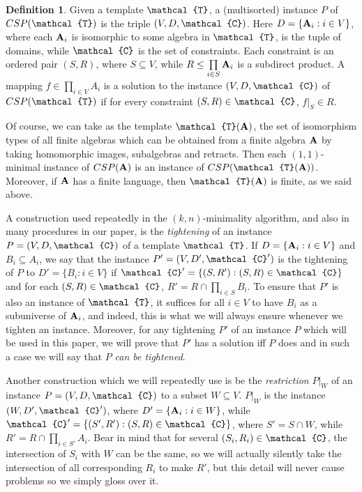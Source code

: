 \documentclass[11pt]{amsart}
\newcommand{\m}[1]{{\uppercase {\mathbf {#1}}}}
\newcommand{\vr}[1]{{\uppercase {\mathcal{#1}}}}
\theoremstyle{definition}
\newtheorem{df}[thm]{Definition}
\begin{document}
\begin{df}\label{multisortedCSP}
Given a template $\vr t$, a (multisorted) instance $P$ of $CSP(\vr t)$ is the triple $(V, D, \vr c)$. Here $D=\{\m a_i:i\in V\}$, where each $\m a_i$ is isomorphic to some algebra in $\vr t$, is the tuple of domains, while $\vr c$ is the set of constraints. Each constraint is an ordered pair $(S,R)$, where $S\subseteq V$, while $R\leq \prod\limits_{i\in S}\m a_i$ is a subdirect product. A mapping $f\in\prod\limits_{i\in V}A_i$ is a solution to the instance $(V,D,\vr c)$ of $CSP(\vr t)$ if for every constraint $(S,R)\in \vr c$, $f|_S\in R$.
\end{df}

Of course, we can take as the template $\vr t(\m a)$, the set of isomorphism types of all finite algebras which can be obtained from a finite algebra $\m a$ by taking homomorphic images, subalgebras and retracts. Then each $(1,1)$-minimal instance of $CSP(\m a)$ is an instance of $CSP(\vr t(\m a))$. Moreover, if $\m a$ has a finite language, then $\vr t(\m a)$ is finite, as we said above.

A construction used repeatedly in the $(k,n)$-minimality algorithm, and also in many procedures in our paper, is the {\em tightening} of an instance $P=(V,D,\vr c)$ of a template $\vr t$. If $D=\{\m A_i:i\in V\}$ and $B_i\subseteq A_i$, we say that the instance $P'=(V,D',\vr c')$ is the tightening of $P$ to $D'=\{B_i:i\in V\}$ if $\vr c'=\{(S,R'):(S,R)\in \vr c\}$ and for each $(S,R)\in \vr c$, $R'=R\cap\prod\limits_{i\in S}B_i$. To ensure that $P'$ is also an instance of $\vr t$, it suffices for all $i\in V$ to have $B_i$ as a subuniverse of $\m a_i$, and indeed, this is what we will always ensure whenever we tighten an instance. Moreover, for any tightening $P'$ of an instance $P$ which will be used in this paper, we will prove that $P'$ has a solution iff $P$ does and in such a case we will say that $P$ {\em can be tightened}.

Another construction which we will repeatedly use is be the {\em restriction} $P|_W$ of an instance $P=(V,D,\vr c)$ to a subset $W\subseteq V$. $P|_W$ is the instance $(W,D',\vr c')$, where $D'=\{\m a_i:i\in W\}$, while $\vr c'=\{(S',R'):(S,R)\in \vr c\}$, where $S'=S\cap W$, while $R'=R\cap\prod\limits_{i\in S'}A_i$. Bear in mind that for several $(S_i,R_i)\in\vr c$, the intersection of $S_i$ with $W$ can be the same, so we will actually silently take the intersection of all corresponding $R_i$ to make $R'$, but this detail will never cause problems so we simply gloss over it.
\end{document}
